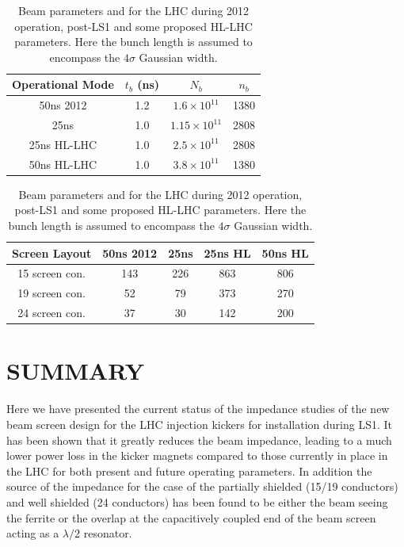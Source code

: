 \documentclass{JAC2003}
\begin{document}
\begin{table}
\caption{Beam parameters and for the LHC during 2012 operation, post-LS1 and some proposed HL-LHC parameters. Here the bunch length is assumed to encompass the $4\sigma$ Gaussian width.}
\label{tab:BrenHLPara}
\begin{center}
\begin{tabular}{c | c | c | c }
Operational Mode & $t_{b}$ (ns) & $N_{b}$ & $n_{b}$ \\ \hline
50ns 2012 & 1.2 & $1.6 \times 10^{11}$ & 1380 \\ \hline
25ns & 1.0 & $1.15 \times 10^{11}$ & 2808 \\ \hline
25ns HL-LHC & 1.0 &  $2.5 \times 10^{11}$ & 2808 \\ \hline
50ns HL-LHC & 1.0 &  $3.8 \times 10^{11}$ & 1380 \\ 
\end{tabular}
\end{center}
\end{table}

\begin{table}
\caption{Beam parameters and for the LHC during 2012 operation, post-LS1 and some proposed HL-LHC parameters. Here the bunch length is assumed to encompass the $4\sigma$ Gaussian width.}
\label{tab:PowLoss}
\begin{center}
\begin{tabular}{c | c | c | c | c}
Screen Layout &50ns 2012&25ns&25ns HL&50ns HL\\ \hline
15 screen con. & 143 & 226 & 863 & 806 \\ \hline
19 screen con. & 52 & 79 & 373 & 270 \\ \hline
24 screen con. & 37 & 30 & 142 & 200 \\
\end{tabular}
\end{center}
\end{table}

\section{SUMMARY}

Here we have presented the current status of the impedance studies of the new beam screen design for the LHC injection kickers for installation during LS1. It has been shown that it greatly reduces the beam impedance, leading to a much lower power loss in the kicker magnets compared to those currently in place in the LHC for both present and future operating parameters. In addition the source of the impedance for the case of the partially shielded (15/19 conductors) and well shielded (24 conductors) has been found to be either the beam seeing the ferrite or the overlap at the capacitively coupled end of the beam screen acting as a $\lambda /2 $ resonator. 
\end{document}
